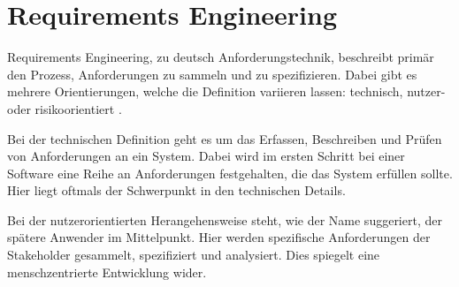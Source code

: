 

\section{Requirements Engineering}
Requirements Engineering, zu deutsch Anforderungstechnik, beschreibt primär den Prozess, Anforderungen zu sammeln und zu spezifizieren.
Dabei gibt es mehrere Orientierungen, welche die Definition variieren lassen: technisch, nutzer- oder risikoorientiert \cite{Glinz.2005, Sommerville.2012}.

Bei der technischen Definition geht es um das Erfassen, Beschreiben und Prüfen von Anforderungen an ein System.
Dabei wird im ersten Schritt bei einer Software eine Reihe an Anforderungen festgehalten, die das System erfüllen sollte.
Hier liegt oftmals der Schwerpunkt in den technischen Details.

Bei der nutzerorientierten Herangehensweise steht, wie der Name suggeriert, der spätere Anwender im Mittelpunkt. 
Hier werden spezifische Anforderungen der Stakeholder gesammelt, spezifiziert und analysiert.
Dies spiegelt eine menschzentrierte Entwicklung wider.

